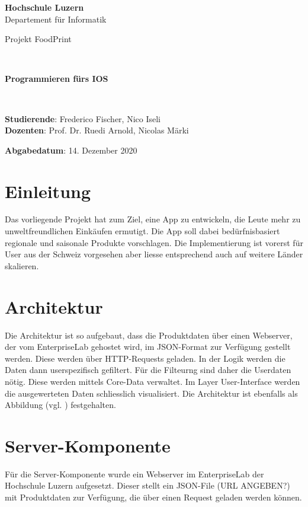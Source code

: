 \documentclass[12pt,titlepage]{article}
\begin{document}
\thispagestyle{empty}

\begin{center}
\textbf{Hochschule Luzern}\\
Departement für Informatik\\[12\baselineskip]

\begin{Huge}
Projekt FoodPrint
\end{Huge} \\[6\baselineskip]

\begin{large}
\textbf{Programmieren fürs IOS}
\end{large} \\[6\baselineskip]

\begin{large}
\textbf{Studierende}: Frederico Fischer, Nico Iseli\\
\textbf{Dozenten}: Prof. Dr. Ruedi Arnold, Nicolas Märki\

\textbf{Abgabedatum}: 14. Dezember 2020 \\ 
\end{large}
\end{center}
\newpage


\section*{Einleitung}
Das vorliegende Projekt hat zum Ziel, eine App zu entwickeln, die Leute mehr zu unweltfreundlichen Einkäufen ermutigt. Die App soll dabei bedürfnisbasiert regionale und saisonale Produkte vorschlagen. Die Implementierung ist vorerst für User aus der Schweiz vorgesehen aber liesse entsprechend auch auf weitere Länder skalieren.

\section*{Architektur}
Die Architektur ist so aufgebaut, dass die Produktdaten über einen Webserver, der vom EnterpriseLab gehostet wird, im JSON-Format zur Verfügung gestellt werden. Diese werden über HTTP-Requests geladen. In der Logik werden die Daten dann userspezifisch gefiltert. Für die Filteurng sind daher die Userdaten nötig. Diese werden mittels Core-Data verwaltet. Im Layer User-Interface werden die ausgewerteten Daten schliesslich visualisiert. Die Architektur ist ebenfalls als Abbildung (vgl. ) festgehalten.

\section*{Server-Komponente}
Für die Server-Komponente wurde ein Webserver im EnterpriseLab der Hochschule Luzern aufgesetzt. Dieser stellt ein JSON-File (URL ANGEBEN?) mit Produktdaten zur Verfügung, die über einen Request geladen werden können. 
\end{document}

